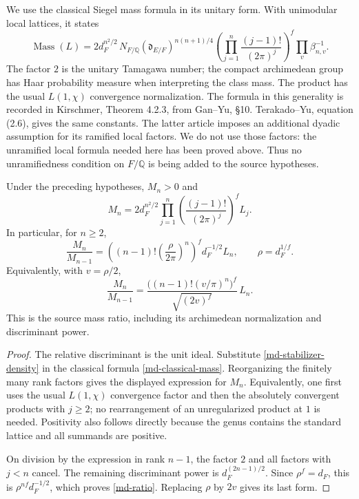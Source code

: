 We use the classical Siegel mass formula in its unitary form.
With unimodular local lattices, it states
\begin{equation}\label{md-classical-mass}
 \operatorname{Mass}(L)=
  2d_F^{n^2/2}\,N_{F/\mathbb Q}(\mathfrak d_{E/F})^{n(n+1)/4}
   \left(\prod_{j=1}^n\frac{(j-1)!}{(2\pi)^j}\right)^f
                            \prod_v\beta_{n,v}^{-1}.
\end{equation}
The factor $2$ is the unitary Tamagawa number; the compact
archimedean group has Haar probability measure when interpreting
the class mass. The product has the usual $L(1,\chi)$ convergence
normalization. The formula in this generality is recorded in
Kirschmer, Theorem 4.2.3, from Gan--Yu, \S10.
Terakado--Yu, equation (2.6), gives the same constants.
\cite{kirschmer-herm,terakado-yu-mass}
The latter article imposes an additional dyadic assumption for
its ramified local factors. We do not use those factors: the
unramified local formula needed here has been proved above.
Thus no unramifiedness condition on $F/\mathbb Q$ is being added
to the source hypotheses.

\begin{theorem}\label{md-mass-ratio}
Under the preceding hypotheses, $M_n>0$ and
\[
 M_n=2d_F^{n^2/2}
             \prod_{j=1}^n
                  \left(\frac{(j-1)!}{(2\pi)^j}\right)^f L_j.
\]
In particular, for $n\geq2$,
\begin{equation}\label{md-ratio}
 \frac{M_n}{M_{n-1}}
       =\left((n-1)!\left(\frac{\rho}{2\pi}\right)^n\right)^f
                   d_F^{-1/2}L_n,
             \qquad \rho=d_F^{1/f}.
\end{equation}
Equivalently, with $v=\rho/2$,
\[
 \frac{M_n}{M_{n-1}}
     =\frac{\bigl((n-1)!(v/\pi)^n\bigr)^f}
                  {\sqrt{(2v)^f}}\,L_n.
\]
This is the source mass ratio, including its archimedean
normalization and discriminant power.
\end{theorem}

\begin{proof}
The relative discriminant is the unit ideal.
Substitute \eqref{md-stabilizer-density} in the classical
formula \eqref{md-classical-mass}. Reorganizing the finitely
many rank factors gives the displayed expression for $M_n$.
Equivalently, one first uses the usual $L(1,\chi)$
convergence factor and then the absolutely convergent products
with $j\geq2$; no rearrangement of an unregularized product at
$1$ is needed. Positivity also follows directly because the
genus contains the standard lattice and all summands are positive.

On division by the expression in rank $n-1$, the factor $2$
and all factors with $j<n$ cancel. The remaining discriminant
power is $d_F^{(2n-1)/2}$. Since $\rho^f=d_F$, this is
$\rho^{nf}d_F^{-1/2}$, which proves \eqref{md-ratio}.
Replacing $\rho$ by $2v$ gives its last form.
\end{proof}

